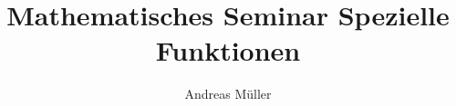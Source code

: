 %
%
%

\beamertemplatenavigationsymbolsempty
\title[MathSem]{Mathematisches Seminar Spezielle Funktionen}
\author[A.~Müller]{Andreas Müller}
\date[]{}



\def\folie#1{
\begin{frame}
\begin{center}
\tt #1
\end{center}
\end{frame}

}
